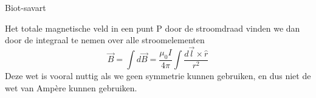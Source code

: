 \begin{lem}{Biot-savart}
\begin{center}
    \end{center}
    Het totale magnetische veld in een punt P door de stroomdraad vinden we dan door de integraal te nemen over alle stroomelementen
    \begin{equation*}
        \Vec{B} = \int d\Vec{B} = \dfrac{\mu_{0}I}{4\pi} \int \dfrac{d\Vec{l} \times \hat{r}}{r^{2}}
    \end{equation*}
    Deze wet is vooral nuttig als we geen symmetrie kunnen gebruiken, en dus niet de wet van Ampère kunnen gebruiken. 
\end{lem}


\newpage

    

